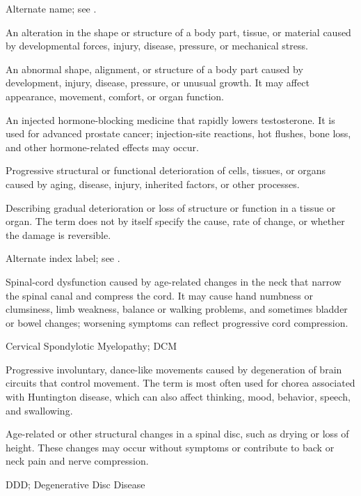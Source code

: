 Alternate name; see .

 An alteration in the shape or structure of a body part, tissue, or material caused by developmental forces, injury, disease, pressure, or mechanical stress.

 An abnormal shape, alignment, or structure of a body part caused by development, injury, disease, pressure, or unusual growth. It may affect appearance, movement, comfort, or organ function.

 An injected hormone-blocking medicine that rapidly lowers testosterone. It is used for advanced prostate cancer; injection-site reactions, hot flushes, bone loss, and other hormone-related effects may occur.

 Progressive structural or functional deterioration of cells, tissues, or organs caused by aging, disease, injury, inherited factors, or other processes.

 Describing gradual deterioration or loss of structure or function in a tissue or organ. The term does not by itself specify the cause, rate of change, or whether the damage is reversible.

 Alternate index label; see .

 Spinal-cord dysfunction caused by age-related changes in the neck that narrow the spinal canal and compress the cord. It may cause hand numbness or clumsiness, limb weakness, balance or walking problems, and sometimes bladder or bowel changes; worsening symptoms can reflect progressive cord compression.

\synonyms
Cervical Spondylotic Myelopathy; DCM

 Progressive involuntary, dance-like movements caused by degeneration of brain circuits that control movement. The term is most often used for chorea associated with Huntington disease, which can also affect thinking, mood, behavior, speech, and swallowing.

 Age-related or other structural changes in a spinal disc, such as drying or loss of height. These changes may occur without symptoms or contribute to back or neck pain and nerve compression.

\synonyms
DDD; Degenerative Disc Disease


